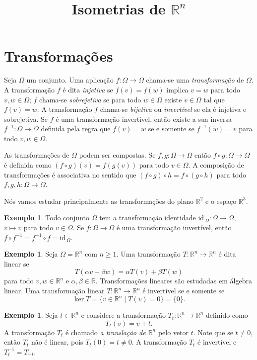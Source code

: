 \documentclass[12pt]{amsart}
\newcommand{\R}{\mathbb R}
\newcommand{\id}{\mbox{id}\,}
\theoremstyle{definition}
\newtheorem{example}[theorem]{Exemplo}
\begin{document}
\title{Isometrias de $\R^n$}
\maketitle

\section{Transformações}

Seja $\Omega$ um conjunto. Uma aplicação $f:\Omega\to \Omega$ chama-se uma \emph{transformação} de $\Omega$. A transformação $f$ é dita \emph{injetiva} se $f(v)=f(w)$ implica $v=w$ para todo $v,w\in\Omega$;
$f$ chama-se \emph{sobrejetiva} se para todo $w\in\Omega$ existe $v\in\Omega$ tal que $f(v)=w$. A transformação
$f$ chama-se \emph{bijetiva} ou \emph{invertível} se ela é injetiva e sobrejetiva. Se $f$ é uma transformação 
invertível, então existe a sua inversa $f^{-1}:\Omega\to\Omega$ definida pela regra que 
$f(v)=w$ se e somente se $f^{-1}(w)=v$ para todo $v,w\in\Omega$.  

As transformações de $\Omega$ podem ser compostas. Se $f,g:\Omega\to \Omega$ então $f\circ g:\Omega\to \Omega$ 
é definida como $(f\circ g)(v)=f(g(v))$ para todo $v\in \Omega$. A composição de transformações é associativa no sentido que $(f\circ g)\circ h=f\circ(g\circ h)$ para todo $f,g,h:\Omega\to \Omega$. 

Nós vamos estudar principalmente as transformações do plano $\R^2$ e o espaço $\R^3$. 

\begin{example}
    Todo conjunto $\Omega$ tem a transformação identidade $\id_\Omega:\Omega\to \Omega$, $v\mapsto v$ 
    para todo $v\in\Omega$. Se $f:\Omega\to\Omega$ é uma transformação invertível, então 
    $f\circ f^{-1}=f^{-1}\circ f=\id_\Omega$. 
\end{example}

\begin{example}
    Seja $\Omega=\R^n$ com $n\geq 1$. Uma transformação $T:\R^n\to\R^n$ é dita linear se 
    \[
        T(\alpha v+\beta w)=\alpha T(v)+\beta T(w)
    \]
    para todo $v,w\in\R^n$ e $\alpha,\beta\in\R$. Transformações lineares são estudadas em álgebra linear.
    Uma transformação linear $T:\R^n\to \R^n$ é invertível se e somente se 
    \[
        \ker T=\{v\in \R^n\mid T(v)=0\}=\{0\}.
    \]
\end{example}

\begin{example}
    Seja $t\in\R^n$ e considere a transformação $T_t:\R^n\to \R^n$ definido como 
    \[
        T_t(v)=v+t.
    \]
    A transformação $T_t$ é chamado \emph{a translação de $\R^n$} pelo vetor $t$. Note que se 
    $t\neq 0$, então $T_t$ não é linear, pois $T_t(0)=t\neq 0$. A transformação $T_t$ é invertível e 
    $T_t^{-1}=T_{-t}$. 
\end{example}
\end{document}
